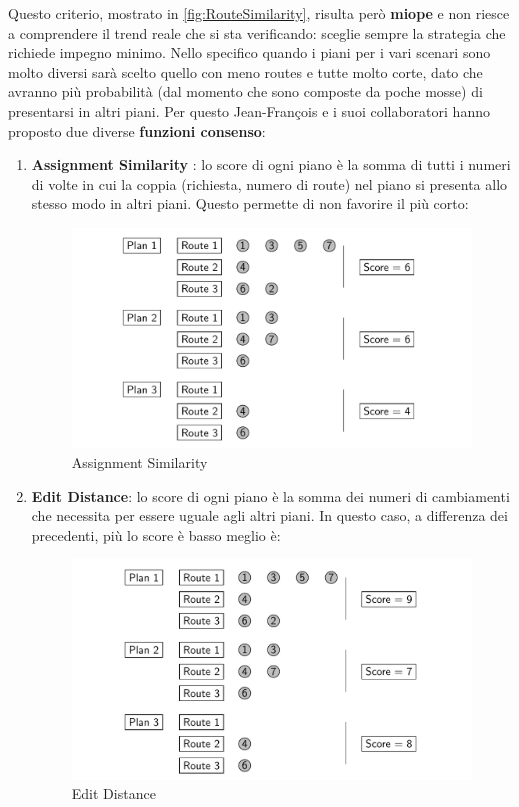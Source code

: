 \documentclass[
    article,            %
    12pt,                %
    oneside,            %
    a4paper,            %
    english,            %
    italian,                %
    sumario=tradicional,
]{abntex2}
\begin{document}
\newpage
Questo criterio, mostrato in \ref{fig:RouteSimilarity}, risulta però \textbf{miope} e non riesce a comprendere il trend reale che si sta verificando: sceglie sempre la strategia che richiede impegno minimo. Nello specifico quando i piani per i vari scenari sono molto diversi sarà scelto quello con meno routes e tutte molto corte, dato che avranno più probabilità (dal momento che sono composte da poche mosse) di presentarsi in altri piani. 
Per questo Jean-François e i suoi collaboratori hanno proposto due diverse
\textbf{funzioni consenso}:

\begin{enumerate}
    \item \textbf{Assignment Similarity} : lo score di ogni piano è la somma di tutti i numeri di volte in cui la coppia (richiesta, numero di route) nel piano si presenta allo stesso modo in altri piani. Questo permette di non favorire il più corto:

    \begin{figure}[h!]
        \centering
        \includegraphics[scale=0.35]{Images/AssignmentSimilarity.png}
        \caption{Assignment Similarity}
        \label{fig:AssignmentSimilarity}
    \end{figure}
    
    \item \textbf{Edit Distance}: lo score di ogni piano è la somma dei numeri di cambiamenti che necessita per essere uguale agli altri piani. In questo caso, a differenza dei precedenti, più lo score è basso meglio è:
    \begin{figure}[h!]
        \centering
        \includegraphics[scale=0.35]{Images/EditDistance.png}
        \caption{Edit Distance}
        \label{fig:EditDistance}
    \end{figure}
    
\end{enumerate}
\end{document}
